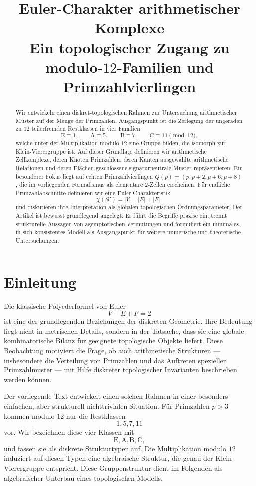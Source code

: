 \documentclass[11pt,a4paper]{article}
\title{Euler-Charakter arithmetischer Komplexe\\[0.4em]
	\large Ein topologischer Zugang zu modulo-$12$-Familien und Primzahlvierlingen}
\author{}
\date{}
\theoremstyle{definition}
\theoremstyle{remark}
\newcommand{\Efam}{\mathrm{E}}
\newcommand{\Afam}{\mathrm{A}}
\newcommand{\Bfam}{\mathrm{B}}
\newcommand{\Cfam}{\mathrm{C}}
\begin{document}
	\maketitle
	
	\begin{abstract}
		Wir entwickeln einen diskret-topologischen Rahmen zur Untersuchung arithmetischer Muster auf der Menge der Primzahlen. Ausgangspunkt ist die Zerlegung der ungeraden zu $12$ teilerfremden Restklassen in vier Familien
		\[
		\Efam\equiv 1,\qquad \Afam\equiv 5,\qquad \Bfam\equiv 7,\qquad \Cfam\equiv 11 \pmod{12},
		\]
		welche unter der Multiplikation modulo $12$ eine Gruppe bilden, die isomorph zur Klein-Vierergruppe ist. Auf dieser Grundlage definieren wir arithmetische Zellkomplexe, deren Knoten Primzahlen, deren Kanten ausgewählte arithmetische Relationen und deren Flächen geschlossene signaturneutrale Muster repräsentieren. Ein besonderer Fokus liegt auf echten Primzahlvierlingen $Q(p)=(p,p+2,p+6,p+8)$, die im vorliegenden Formalismus als elementare $2$-Zellen erscheinen. Für endliche Primzahlabschnitte definieren wir eine Euler-Charakteristik
		\[
		\chi(\mathcal K)=|V|-|E|+|F|,
		\]
		und diskutieren ihre Interpretation als globalen topologischen Ordnungsparameter. Der Artikel ist bewusst grundlegend angelegt: Er führt die Begriffe präzise ein, trennt strukturelle Aussagen von asymptotischen Vermutungen und formuliert ein minimales, in sich konsistentes Modell als Ausgangspunkt für weitere numerische und theoretische Untersuchungen.
	\end{abstract}
	
	\tableofcontents
	
	\section{Einleitung}
	
	Die klassische Polyederformel von Euler
	\[
	V-E+F=2
	\]
	ist eine der grundlegenden Beziehungen der diskreten Geometrie. Ihre Bedeutung liegt nicht in metrischen Details, sondern in der Tatsache, dass sie eine globale kombinatorische Bilanz für geeignete topologische Objekte liefert. Diese Beobachtung motiviert die Frage, ob auch arithmetische Strukturen --- insbesondere die Verteilung von Primzahlen und das Auftreten spezieller Primzahlmuster --- mit Hilfe diskreter topologischer Invarianten beschrieben werden können.
	
	Der vorliegende Text entwickelt einen solchen Rahmen in einer besonders einfachen, aber strukturell nichttrivialen Situation. Für Primzahlen $p>3$ kommen modulo $12$ nur die Restklassen
	\[
	1,5,7,11
	\]
	vor. Wir bezeichnen diese vier Klassen mit
	\[
	\Efam,\Afam,\Bfam,\Cfam,
	\]
	und fassen sie als diskrete Strukturtypen auf. Die Multiplikation modulo $12$ induziert auf diesen Typen eine algebraische Struktur, die genau der Klein-Vierergruppe entspricht. Diese Gruppenstruktur dient im Folgenden als algebraischer Unterbau eines topologischen Modells.
	
\end{document}
